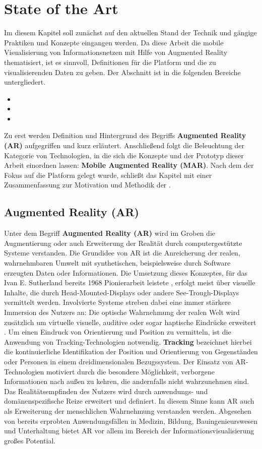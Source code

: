 %
\chapter{State of the Art}
\label{sec:sota}
Im diesem Kapitel soll zunächst auf den aktuellen Stand der Technik und gängige Praktiken und Konzepte eingangen werden. Da diese Arbeit die mobile Visualisierung von Informationsnetzen mit Hilfe von Augmented Reality thematisiert, ist es sinnvoll, Definitionen für die Platform und die zu visualisierenden Daten zu geben. Der Abschnitt ist in die folgenden Bereiche untergliedert.
\begin{itemize}
	\item {}
	\item {}
	\item {} 
\end{itemize}
Zu erst werden Definition und Hintergrund des Begriffs \textbf {Augmented Reality (AR)} aufgegriffen und kurz erläutert. Anschließend folgt die Beleuchtung der Kategorie von Technologien, in die sich die Konzepte und der Prototyp dieser Arbeit einordnen lassen: \textbf{Mobile Augmented Reality (MAR)}. Nach dem der Fokus auf die Platform gelegt wurde, schließt das Kapitel mit einer Zusammenfassung zur Motivation und Methodik der \textbf{}.
\section{Augmented Reality (AR)}
\label{sec:sota:ar}
Unter dem Begriff \textbf{Augmented Reality (AR)} wird im Groben die Augmentierung oder auch Erweiterung der Realität durch computergestützte Systeme verstanden. Die Grundidee von AR ist die Anreicherung der realen, wahrnehmbaren Umwelt mit synthetischen, beispielsweise durch Software erzeugten Daten oder Informationen. Die Umsetzung dieses Konzeptes, für das Ivan E. Sutherland bereits 1968 Pionierarbeit leistete \cite{Sutherland1968}, erfolgt meist über visuelle Inhalte, die durch Head-Mounted-Displays oder andere See-Trough-Displays vermittelt werden. Involvierte Systeme streben dabei eine immer stärkere Immersion des Nutzers an: Die optische Wahrnehmung der realen Welt wird zusätzlich um virtuelle visuelle, auditive oder sogar haptische Eindrücke erweitert \cite{Feiner1997}. Um einen Eindruck von Orientierung und Position zu vermitteln, ist die Anwendung von Tracking-Technologien notwendig. \textbf{Tracking} bezeichnet hierbei die kontinuierliche Identifikation der Position und Orientierung \cite{Perey2013} von Gegenständen oder Personen in einem dreidimensionalen Bezugssystem. Der Einsatz von AR-Technologien motiviert durch die besondere Möglichkeit, verborgene Informationen nach außen zu kehren, die andernfalls nicht wahrzunehmen sind. Das Realitätsempfinden des Nutzers wird durch anwendungs- und domänenspezifische Reize erweitert und definiert. In diesem Sinne kann AR auch als Erweiterung der menschlichen Wahrnehmung verstanden werden. Abgesehen von bereits erprobten Anwendungsfällen in Medizin, Bildung, Bauingenieurswesen und Unterhaltung bietet AR vor allem im Bereich der Informationsvisualisierung großes Potential. 

